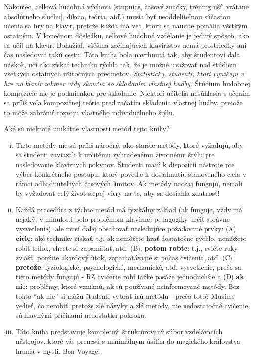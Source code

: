 Nakoniec, celková hudobná výchova (stupnice, časové značky, tréning uší [vrátane absolútneho sluchu], dikcia, teória, atď.) musia byť neoddeliteľnou súčasťou učenia sa hry na klavír, pretože každá iná  vec, ktorú sa naučíte pomáha všetkým ostatným. V konečnom dôsledku, celkové hudobné vzdelanie je jediný spôsob, ako sa učiť na klavír. Bohužiaľ, väčšina začínajúcich klaviristov nemá prostriedky ani čas nasledovať takú cestu. Táto kniha bola navrhnutá tak, aby študentovi dala náskok, učí ako získať techniku rýchlo tak, že je možné uvažovať nad štúdiom všetkých ostatných užitočných predmetov. \emph{Štatisticky, študenti, ktorí vynikajú v hre na klavír takmer vždy skončia so skladaním vlastnej hudby.} Štúdium hudobnej kompozície nie je podmienkou pre skladanie. Niektorí učitelia nesúhlasia s učením sa príliš veľa kompozičnej teórie pred začatím skladania vlastnej hudby, pretože to môže zabrániť rozvoju vlastného individuálneho štýlu.

Aké sú niektoré unikátne vlastnosti metód tejto knihy?
\begin{enumerate}[(i)]
\item Tieto metódy nie sú príliš náročné, ako staršie metódy, ktoré vyžadujú, aby sa študenti zaviazali k určitému vyhradenému životnému štýlu pre nasledovanie klavírnych pokynov. Študenti majú k dispozícii nástroje pre výber konkrétneho postupu, ktorý povedie k dosiahnutiu stanoveného cieľa v rámci odhadnuteľných časových limitov. Ak metódy naozaj fungujú, nemali by vyžadovať celý život slepej viery na to, aby sa dosiahla zdatnosť!
\item Každá procedúra z týchto metód má fyzikálny základ (ak funguje, vždy má nejaký; v minulosti bolo problémom klavírnej pedagogiky určiť správne vysvetlenie), ale musí ďalej obsahovať nasledujúce požadované prvky: (A) \textbf{ciele}: aké techniky získať, t.j. ak nemôžete hrať dostatočne rýchlo, nemôžete robiť trilok, chcete si zapamätať, atď. (B), \textbf{potom robte}: t.j., cvičte ruky zvlášť, použite akordový útok, zapamätávajte si počas cvičenia, atď. (C) \textbf{pretože}: fyziologické, psychologické, mechanické, atď. vysvetlenie, prečo sa tieto metódy fungujú - RZ cvičenie robí ťažké pasáže jednoduchšie a (D) \textbf{ak nie}: problémy, ktoré vzniknú, ak sú používané neinformované metódy. Bez tohto “ak nie” si môžu študenti vybrať inú metódu - prečo toto? Musíme vedieť, čo nerobiť, pretože zlé návyky a zlé metódy, nie nedostatočné cvičenie, sú hlavnými príčinami nedostatku pokroku.
\item Táto kniha predstavuje kompletný, štruktúrovaný súbor vzdelávacích nástrojov, ktoré vás prenesú s minimálnym úsilím do magického kráľovstva hrania v mysli. Bon Voyage!
\end{enumerate}

